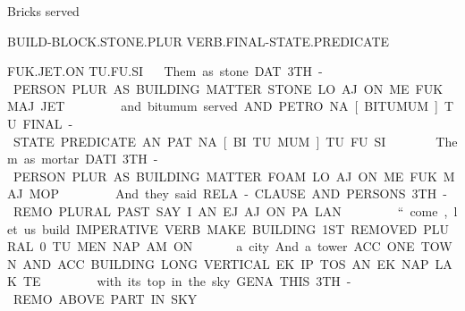 {{Bricks 				served 				 

BUILD-BLOCK.STONE.PLUR          VERB.FINAL-STATE.PREDICATE	 

FUK.JET.ON			TU.FU.SI			 
\fuk\jet\on ~ \tu\fu\si
\drie

Them			as 	stone	 

DAT.3TH-PERSON.PLUR AS	BUILDING.MATTER.STONE. 

LO.AJ.ON		ME	FUK.MAJ.JET 

\lo\aj\on ~ \me ~\fuk\maj\jet
\drie
  

and	bitumum 		served  

AND	PETRO.NA[BITUMUM]	TU.FINAL-STATE.PREDICATE 

AN	PAT.NA[BI.TU.MUM]	TU.FU.SI 

\an ~ \pat\na\cartouche{\pi\tu\mum} ~ \tu\fu\si
\drie


  

Them				as 	mortar 

DATI.3TH-PERSON.PLUR               AS	BUILDING.MATTER.FOAM 

LO.AJ.ON			ME	FUK.MAJ.MOP 

\lo\aj\on ~\me ~\fuk\maj\mop
\drie
  

And 			they 				said  

RELA-CLAUSE.AND          PERSONS.3TH-REMO.PLURAL 	PAST.SAY 

I.AN			EJ.AJ.ON			PA.LAN 

\Atlani\an ~ \ej\aj\on ~ \pa\lan
\drie

  

“come, let us build                                                                          

IMPERATIVE.VERB.MAKE. BUILDING.1ST.REMOVED.PLURAL	 

0.TU.MEN.NAP.AM.ON                                                                              
\Atlano\tu\men\nap\am\on

 

a city			And 	a tower	 

ACC.ONE.TOWN		AND	ACC.BUILDING.LONG.VERTICAL 

EK.IP.TOS		AN	EK.NAP.LAK.TE	 

\Atlani\an ~ \ej\aj\on ~ \pa\lan
\drie

 

with its top 				in           the sky 

GENA.THIS.3TH-REMO.ABOVE.PART	IN	SKY 

\ta\es\aj\ef\pu~		\in	\som 
\drie

}}
